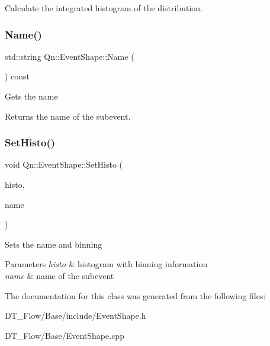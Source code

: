 Calculate the integrated histogram of the distribution. \mbox{\label{classQn_1_1EventShape_abc015406701863883722b6b848fa2ac0}} 
\subsubsection{\texorpdfstring{Name()}{Name()}}
{\footnotesize\ttfamily std\+::string Qn\+::\+Event\+Shape\+::\+Name (\begin{DoxyParamCaption}{ }\end{DoxyParamCaption}) const\hspace{0.3cm}{\ttfamily [inline]}}

Gets the name \begin{DoxyReturn}{Returns}
the name of the subevent. 
\end{DoxyReturn}
\mbox{\label{classQn_1_1EventShape_a306f3bb8d75c6feae8b5f633a724d73e}} 
\subsubsection{\texorpdfstring{Set\+Histo()}{SetHisto()}}
{\footnotesize\ttfamily void Qn\+::\+Event\+Shape\+::\+Set\+Histo (\begin{DoxyParamCaption}\item[{T\+H1F $\ast$}]{histo,  }\item[{std\+::string}]{name }\end{DoxyParamCaption})\hspace{0.3cm}{\ttfamily [inline]}}

Sets the name and binning 
\begin{DoxyParams}{Parameters}
{\em histo} & histogram with binning information \\
\hline
{\em name} & name of the subevent \\
\hline
\end{DoxyParams}


The documentation for this class was generated from the following files\+:\begin{DoxyCompactItemize}
\item 
D\+T\+\_\+\+Flow/\+Base/include/Event\+Shape.\+h\item 
D\+T\+\_\+\+Flow/\+Base/Event\+Shape.\+cpp\end{DoxyCompactItemize}
